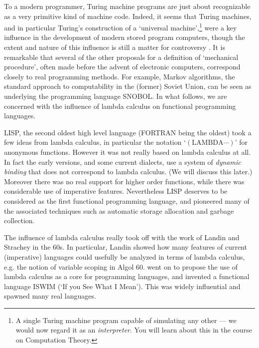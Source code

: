 To a modern programmer, Turing machine programs are just about recognizable as
a very primitive kind of machine code. Indeed, it seems that Turing machines,
and in particular Turing's construction of a `universal machine',\footnote{A
single Turing machine program capable of simulating any other --- we would now
regard it as an {\em interpreter}. You will learn about this in the course on
Computation Theory.} were a key influence in the development of modern stored
program computers, though the extent and nature of this influence is still a
matter for controversy \cite{robinson-turing}. It is remarkable that several of
the other proposals for a definition of `mechanical procedure', often made
before the advent of electronic computers, correspond closely to real
programming methods. For example, Markov algorithms, the standard approach to
computability in the (former) Soviet Union, can be seen as underlying the
programming language SNOBOL. In what follows, we are concerned with the
influence of lambda calculus on functional programming languages.

LISP, the second oldest high level language (FORTRAN being the oldest) took a
few ideas from lambda calculus, in particular the notation `$(\mbox{LAMBDA}
\cdots)$' for anonymous functions. However it was not really based on lambda
calculus at all. In fact the early versions, and some current dialects, use a
system of {\em dynamic binding} that does not correspond to lambda calculus.
(We will discuss this later.) Moreover there was no real support for higher
order functions, while there was considerable use of imperative features.
Nevertheless LISP deserves to be considered as the first functional programming
language, and pioneered many of the associated techniques such as automatic
storage allocation and garbage collection.

The influence of lambda calculus really took off with the work of Landin and
Strachey in the 60s. In particular, Landin showed how many features of current
(imperative) languages could usefully be analyzed in terms of lambda calculus,
e.g. the notion of variable scoping in Algol 60.  went on to
propose the use of lambda calculus as a core for programming languages, and
invented a functional language ISWIM (`If you See What I Mean'). This was
widely influential and spawned many real languages.

